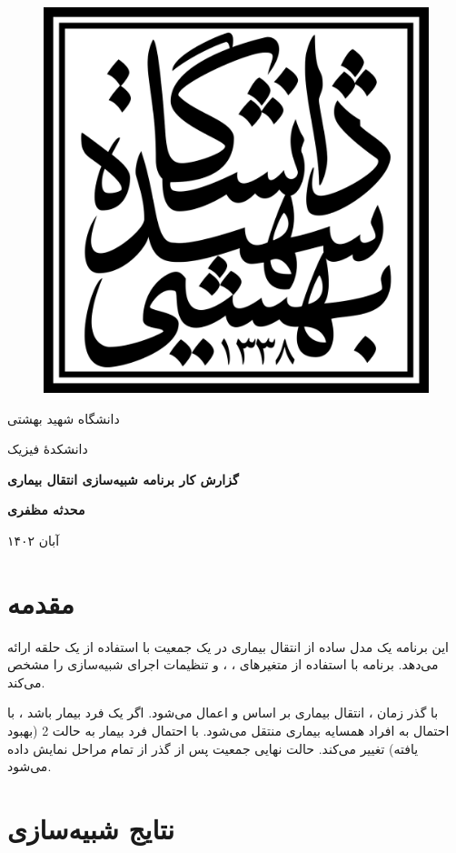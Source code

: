\documentclass[12pt,onecolumn,a4paper]{article}
\begin{document}
\begin{figure}[t]   
    \centerline{
        \includegraphics[height =5 cm]{Sbu-logo.svg.png}}
\end{figure}
\begin{center}
دانشگاه شهید بهشتی

دانشکدهٔ فیزیک

\vspace{30pt}

\vspace{12pt}
\Huge
\textbf{
    گزارش کار برنامه شبیه‌سازی انتقال بیماری
}

\LARGE

\vspace{100pt}

\textbf{
محدثه مظفری}




\vspace{30pt}
\large
آبان
۱۴۰۲

\end{center}


\pagebreak

\section{مقدمه}
این برنامه یک مدل ساده از انتقال بیماری در یک جمعیت با استفاده از یک حلقه ارائه می‌دهد. برنامه با استفاده از متغیرهای
،
،
و
تنظیمات اجرای شبیه‌سازی را مشخص می‌کند.

با گذر زمان
، انتقال بیماری بر اساس 
 و 
اعمال می‌شود.
اگر یک فرد بیمار باشد ، با احتمال 
به افراد همسایه بیماری منتقل می‌شود.
با احتمال 
فرد بیمار به حالت 2 (بهبود یافته) تغییر می‌کند.
حالت نهایی جمعیت پس از گذر از تمام مراحل نمایش داده می‌شود.

\section{نتایج شبیه‌سازی}
\end{document}
